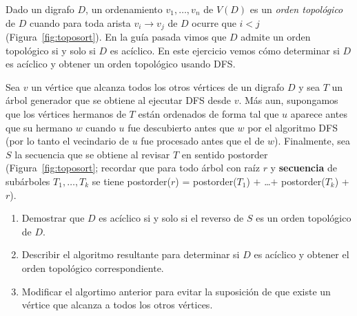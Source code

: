 
 \item Dado un digrafo $D$, un ordenamiento $v_1, \ldots, v_n$ de $V(D)$ es un  \emph{orden topológico} de $D$ cuando para toda arista $v_i \to v_j$ de $D$ ocurre que $i < j$ (Figura~\ref{fig:toposort}).  En la guía pasada vimos que $D$ admite un orden topológico si y solo si $D$ es acíclico.  En este ejercicio vemos cómo determinar si $D$ es acíclico y obtener un orden topológico usando DFS.
 
 Sea $v$ un vértice que alcanza todos los otros vértices de un digrafo $D$ y sea $T$ un árbol generador que se obtiene al ejecutar DFS desde $v$.  Más aun, supongamos que los vértices hermanos de $T$ están ordenados de forma tal que $u$ aparece antes que su hermano $w$ cuando $u$ fue descubierto antes que $w$ por el algoritmo DFS (por lo tanto el vecindario de $u$ fue procesado antes que el de $w$).  Finalmente, sea $S$ la secuencia que se obtiene al revisar $T$ en sentido postorder (Figura~\ref{fig:toposort}; recordar que para todo árbol con raíz $r$ y \textbf{secuencia} de subárboles $T_1, \ldots, T_k$ se tiene postorder($r$) = postorder($T_1$) $+$ \ldots $+$ postorder($T_k$) + $r$).
 
 \begin{enumerate}[label=$\alph*)$,ref=$\alph*)$]
  \item Demostrar que $D$ es acíclico si y solo si el reverso de $S$ es un orden topológico de $D$.
  
  \item Describir el algoritmo resultante para determinar si $D$ es acíclico y obtener el orden topológico correspondiente.

  \item Modificar el algortimo anterior para evitar la suposición de que existe un vértice que alcanza a todos los otros vértices.
 \end{enumerate}
 
